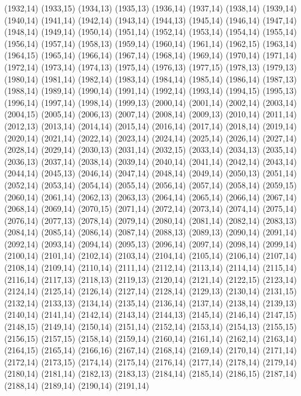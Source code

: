 (1932,14)
(1933,15)
(1934,13)
(1935,13)
(1936,14)
(1937,14)
(1938,14)
(1939,14)
(1940,14)
(1941,14)
(1942,14)
(1943,14)
(1944,13)
(1945,14)
(1946,14)
(1947,14)
(1948,14)
(1949,14)
(1950,14)
(1951,14)
(1952,14)
(1953,14)
(1954,14)
(1955,14)
(1956,14)
(1957,14)
(1958,13)
(1959,14)
(1960,14)
(1961,14)
(1962,15)
(1963,14)
(1964,15)
(1965,14)
(1966,14)
(1967,14)
(1968,14)
(1969,14)
(1970,14)
(1971,14)
(1972,14)
(1973,14)
(1974,13)
(1975,14)
(1976,13)
(1977,15)
(1978,13)
(1979,13)
(1980,14)
(1981,14)
(1982,14)
(1983,14)
(1984,14)
(1985,14)
(1986,14)
(1987,13)
(1988,14)
(1989,14)
(1990,14)
(1991,14)
(1992,14)
(1993,14)
(1994,15)
(1995,13)
(1996,14)
(1997,14)
(1998,14)
(1999,13)
(2000,14)
(2001,14)
(2002,14)
(2003,14)
(2004,15)
(2005,14)
(2006,13)
(2007,14)
(2008,14)
(2009,13)
(2010,14)
(2011,14)
(2012,13)
(2013,14)
(2014,14)
(2015,14)
(2016,14)
(2017,14)
(2018,14)
(2019,14)
(2020,14)
(2021,14)
(2022,14)
(2023,14)
(2024,14)
(2025,14)
(2026,14)
(2027,14)
(2028,14)
(2029,14)
(2030,13)
(2031,14)
(2032,15)
(2033,14)
(2034,13)
(2035,14)
(2036,13)
(2037,14)
(2038,14)
(2039,14)
(2040,14)
(2041,14)
(2042,14)
(2043,14)
(2044,14)
(2045,13)
(2046,14)
(2047,14)
(2048,14)
(2049,14)
(2050,13)
(2051,14)
(2052,14)
(2053,14)
(2054,14)
(2055,14)
(2056,14)
(2057,14)
(2058,14)
(2059,15)
(2060,14)
(2061,14)
(2062,13)
(2063,13)
(2064,14)
(2065,14)
(2066,14)
(2067,14)
(2068,14)
(2069,14)
(2070,15)
(2071,14)
(2072,14)
(2073,14)
(2074,14)
(2075,14)
(2076,14)
(2077,13)
(2078,14)
(2079,14)
(2080,14)
(2081,14)
(2082,14)
(2083,13)
(2084,14)
(2085,14)
(2086,14)
(2087,14)
(2088,13)
(2089,13)
(2090,14)
(2091,14)
(2092,14)
(2093,14)
(2094,14)
(2095,13)
(2096,14)
(2097,14)
(2098,14)
(2099,14)
(2100,14)
(2101,14)
(2102,14)
(2103,14)
(2104,14)
(2105,14)
(2106,14)
(2107,14)
(2108,14)
(2109,14)
(2110,14)
(2111,14)
(2112,14)
(2113,14)
(2114,14)
(2115,14)
(2116,14)
(2117,13)
(2118,13)
(2119,13)
(2120,14)
(2121,14)
(2122,15)
(2123,14)
(2124,14)
(2125,14)
(2126,14)
(2127,14)
(2128,14)
(2129,13)
(2130,14)
(2131,15)
(2132,14)
(2133,13)
(2134,14)
(2135,14)
(2136,14)
(2137,14)
(2138,14)
(2139,13)
(2140,14)
(2141,14)
(2142,14)
(2143,14)
(2144,13)
(2145,14)
(2146,14)
(2147,15)
(2148,15)
(2149,14)
(2150,14)
(2151,14)
(2152,14)
(2153,14)
(2154,13)
(2155,15)
(2156,15)
(2157,15)
(2158,14)
(2159,14)
(2160,14)
(2161,14)
(2162,14)
(2163,14)
(2164,15)
(2165,14)
(2166,16)
(2167,14)
(2168,14)
(2169,14)
(2170,14)
(2171,14)
(2172,14)
(2173,15)
(2174,14)
(2175,14)
(2176,14)
(2177,14)
(2178,14)
(2179,14)
(2180,14)
(2181,14)
(2182,13)
(2183,13)
(2184,14)
(2185,14)
(2186,15)
(2187,14)
(2188,14)
(2189,14)
(2190,14)
(2191,14)
